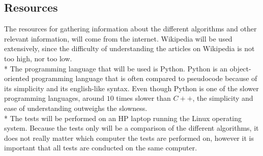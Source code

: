 \documentclass[main.tex]{subfiles}
\begin{document}
\subsection{Resources}
The resources for gathering information about the different algorithms and other relevant information, will come from the internet. Wikipedia will be used extensively, since the difficulty of understanding the articles on Wikipedia is not too high, nor too low.
\newline
\\*
The programming language that will be used is Python. Python is an object-oriented programming language that is often compared to pseudocode because of its simplicity and its english-like syntax. Even though Python is one of the slower programming languages, around $10$ times slower than $C++$, the simplicity and ease of understanding outweighs the slowness. 
\newline
\\*
The tests will be performed on an HP laptop running the Linux operating system. Because the tests only will be a comparison of the different algorithms, it does not really matter which computer the tests are performed on, however it is important that all tests are conducted on the same computer. 
\end{document}
